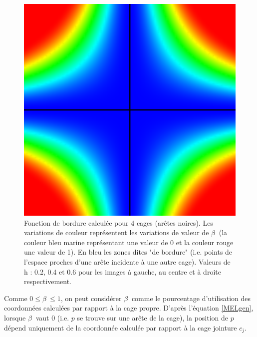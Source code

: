 \begin{figure}[h]
\begin{center}
    \includegraphics[scale=0.35]{starCage-0-6}
    \caption{Fonction de bordure calculée pour 4 cages (arêtes
      noires). Les variations de couleur représentent les variations
      de valeur de $\beta~$ (la couleur bleu marine représentant une
      valeur de 0 et la couleur rouge une valeur de 1). En bleu les
      zones dites "de bordure" (i.e. points de l'espace proches d'une
      arête incidente à une autre cage). Valeurs de h : 0.2, 0.4 et
      0.6 pour les images à gauche, au centre et à droite
      respectivement.}
    \label{MELpar}
  \end{center}
\end{figure}

Comme $0 \leq \beta~ \leq 1$, on peut considérer $\beta~$ comme le
pourcentage d'utilisation des coordonnées calculées par rapport à la
cage propre. D'après l'équation \ref{MELgen}, lorsque $\beta~$ vaut 0
(i.e. $p$ se trouve sur une arête de la cage), la position de $p$
dépend uniquement de la coordonnée calculée par rapport à la cage
jointure $c_j$.

